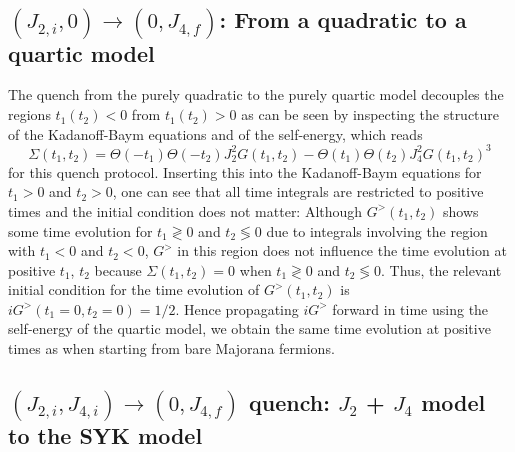 \documentclass[prx,aps,onecolumn,amsfonts,showpacs,superscriptaddress,preprint,eqsecnum]
{revtex4-1}
\begin{document}
\subsection{$(J_{2,i},0) \rightarrow (0,J_{4,f})$: From a quadratic to a quartic model}
The quench from the purely quadratic to the purely quartic model decouples the regions $t_1(t_2) < 0$ 
from $t_1(t_2) >0$ as can be seen by inspecting the structure of the Kadanoff-Baym equations and of the self-energy, which reads
\begin{equation}
	\Sigma(t_1, t_2) = \Theta(-t_1) \Theta(-t_2) J_2^2 G(t_1, t_2) - \Theta(t_1) \Theta(t_2) 
J_4^2 G(t_1, t_2)^3
\end{equation}
for this quench protocol. Inserting this into the Kadanoff-Baym equations for 
$t_1>0$ and $t_2>0$, one can see that all time integrals are restricted to 
positive times and the initial condition does not matter: Although $G^>(t_1, t_2)$ 
shows some time evolution for $t_1 \gtrless 0$ and $t_2 \lessgtr 0$ due to 
integrals involving the region with $t_1 < 0$ and $t_2 < 0$, $G^>$ in this 
region does not influence the time evolution at positive $t_1$, $t_2$ because 
$\Sigma(t_1, t_2) = 0$ when $t_1 \gtrless 0$ and $t_2 \lessgtr 0$. Thus, the relevant 
initial condition for the time evolution of $G^>(t_1, t_2)$ is $iG^>(t_1 = 0, t_2 = 
0) = 1/2$. Hence propagating $iG^>$ forward 
in time using the self-energy of the quartic model, we obtain the same time 
evolution at positive times as when starting from bare Majorana fermions.

\subsection{$(J_{2,i},J_{4,i}) \rightarrow (0,J_{4,f})$ %
quench: $J_2$ + $J_4$ model to the SYK model}
\label{sec:j2j4j2}
\end{document}
